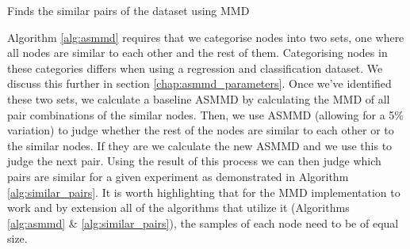 \documentclass{mpaper}
\begin{document}
\begin{algorithm}
    \DontPrintSemicolon
    \caption{Finds the similar pairs of the dataset using MMD
    }\label{alg:similar_pairs}
    
    
\end{algorithm}

Algorithm \ref{alg:asmmd} requires that we categorise nodes into two sets, one where all nodes are similar to each other and the rest of them. Categorising nodes in these categories differs when using a regression and classification dataset. We discuss this further in section \ref{chap:asmmd_parameters}. Once we've identified these two sets, we calculate a baseline ASMMD by calculating the MMD of all pair combinations of the similar nodes. Then, we use ASMMD (allowing for a 5\% variation) to judge whether the rest of the nodes are similar to each other or to the similar nodes. If they are we calculate the new ASMMD and we use this to judge the next pair. Using the result of this process we can then judge which pairs are similar for a given experiment as demonstrated in Algorithm  \ref{alg:similar_pairs}. It is worth highlighting that for the MMD implementation to work and by extension all of the algorithms that utilize it (Algorithms \ref{alg:asmmd} \& \ref{alg:similar_pairs}), the samples of each node need to be of equal size.
\end{document}
